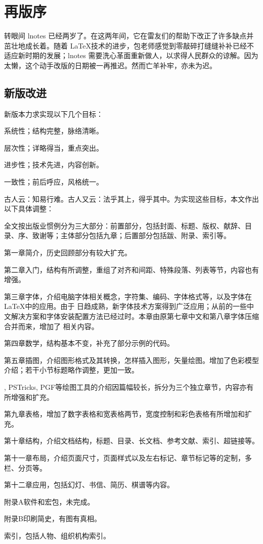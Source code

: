 \chapter{再版序}

转眼间 lnotes 已经两岁了。在这两年间，它在雷友们的帮助下改正了许多缺点并茁壮地成长着。随着 \LaTeX 技术的进步，包老师感觉到零敲碎打缝缝补补已经不适应新时期的发展；lnotes 需要洗心革面重新做人，以求得人民群众的谅解。因为太懒，这个动手改版的日期被一再推迟。然而亡羊补牢，亦未为迟。

\section*{新版改进}
新版本力求实现以下几个目标：

\begin{compactenum}
    \item 系统性；结构完整，脉络清晰。
    \item 层次性；详略得当，重点突出。
    \item 进步性；技术先进，内容创新。
    \item 一致性；前后呼应，风格统一。
\end{compactenum}

古人云：知易行难。古人又云：法乎其上，得乎其中。为实现这些目标，本文作出以下具体调整：

\begin{compactenum}
    \item 全文按出版业惯例分为三大部分：前置部分，包括封面、标题、版权、献辞、目录、序、致谢等；主体部分包括九章；后置部分包括跋、附录、索引等。
    \item 第一章简介，历史回顾部分有较大扩充。
    \item 第二章入门，结构有所调整，重组了对齐和间距、特殊段落、列表等节，内容也有增强。
    \item 第三章字体，介绍电脑字体相关概念，字符集、编码、字体格式等，以及字体在 \LaTeX 中的应用。由于 \XeTeX 日趋成熟，新字体技术方案得到广泛应用；从前的一些中文解决方案和字体安装配置方法已经过时。本章由原第七章中文和第八章字体压缩合并而来，增加了 \XeTeX 相关内容。
    \item 第四章数学，结构基本不变，补充了部分示例的代码。
    \item 第五章插图，介绍图形格式及其转换，怎样插入图形，矢量绘图。增加了色彩模型介绍；若干小节标题略作调整，更加一致。
    \item \MP, PSTricks, PGF等绘图工具的介绍因篇幅较长，拆分为三个独立章节，内容亦有所增强和扩充。
    \item 第九章表格，增加了数字表格和宽表格两节，宽度控制和彩色表格有所增加和扩充。
    \item 第十章结构，介绍文档结构，标题、目录、长文档、参考文献、索引、超链接等。
    \item 第十一章布局，介绍页面尺寸，页面样式以及左右标记、章节标记等的定制，多栏、分页等。
    \item 第十二章应用，包括幻灯、书信、简历、棋谱等内容。
    \item 附录A软件和宏包，未完成。
    \item 附录B印刷简史，有图有真相。
    \item 索引，包括人物、组织机构索引。
\end{compactenum}

